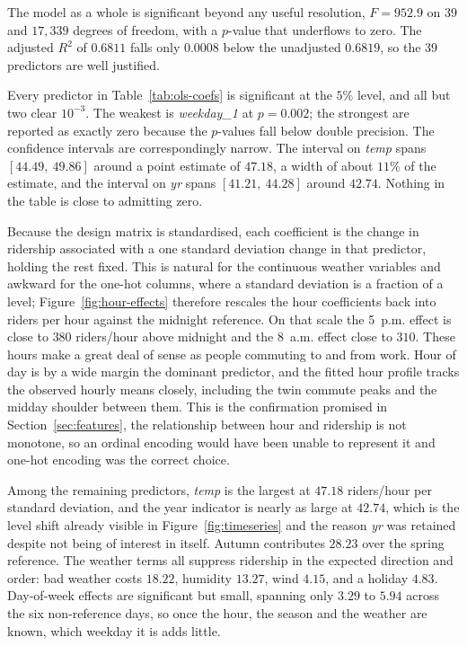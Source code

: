 \documentclass[11pt]{article}
\begin{document}


The model as a whole is significant beyond any useful resolution, $F =
952.9$ on $39$ and $17{,}339$ degrees of freedom, with a $p$-value that
underflows to zero. The adjusted $R^2$ of $0.6811$ falls only $0.0008$
below the unadjusted $0.6819$, so the $39$ predictors are well justified.

Every predictor in Table~\ref{tab:ols-coefs} is significant at the
$5\%$ level, and all but two clear $10^{-3}$. The weakest is
\textit{weekday\_1} at $p = 0.002$; the strongest are reported as
exactly zero because the $p$-values fall below double precision. The
confidence intervals are correspondingly narrow. The interval on
\textit{temp} spans $[44.49,\ 49.86]$ around a point estimate of
$47.18$, a width of about $11\%$ of the estimate, and the interval on
\textit{yr} spans $[41.21,\ 44.28]$ around $42.74$. Nothing in the
table is close to admitting zero.

Because the design matrix is standardised, each coefficient is the
change in ridership associated with a one standard deviation change in
that predictor, holding the rest fixed. This is natural for the
continuous weather variables and awkward for the one-hot columns, where
a standard deviation is a fraction of a level; Figure~\ref{fig:hour-effects}
therefore rescales the hour coefficients back into riders per hour
against the midnight reference. On that scale the 5~p.m. effect is
close to $380$ riders/hour above midnight and the 8~a.m. effect close
to $310$. These hours make a great deal of sense as people commuting
to and from work. Hour of day is by a wide margin the dominant predictor, and
the fitted hour profile tracks the observed hourly means closely,
including the twin commute peaks and the midday shoulder between them.
This is the confirmation promised in Section~\ref{sec:features}, the
relationship
between hour and ridership is not monotone, so an ordinal encoding
would have been unable to represent it and one-hot encoding was the
correct choice.

Among the remaining predictors, \textit{temp} is the largest at
$47.18$ riders/hour per standard deviation, and the year indicator is
nearly as large at $42.74$, which is the level shift already visible in
Figure~\ref{fig:timeseries} and the reason \textit{yr} was retained
despite not being of interest in itself. Autumn contributes $28.23$
over the spring reference. The weather terms all suppress ridership in
the expected direction and order: bad weather costs $18.22$, humidity
$13.27$, wind $4.15$, and a holiday $4.83$. Day-of-week effects are
significant but small, spanning only $3.29$ to $5.94$ across the six
non-reference days, so once the hour, the season and the weather are
known, which weekday it is adds little.
\end{document}
